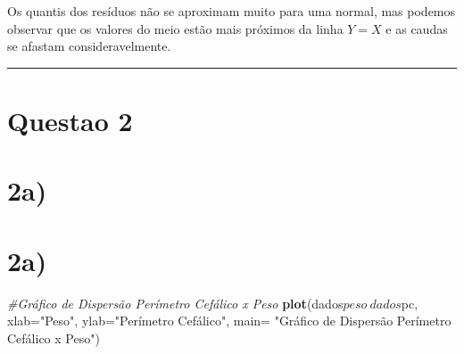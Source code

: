 \documentclass[11pt,]{article}
\newenvironment{Shaded}{\begin{snugshade}}{\end{snugshade}}
\newcommand{\KeywordTok}[1]{\textcolor[rgb]{0.13,0.29,0.53}{\textbf{{#1}}}}
\newcommand{\DataTypeTok}[1]{\textcolor[rgb]{0.13,0.29,0.53}{{#1}}}
\newcommand{\StringTok}[1]{\textcolor[rgb]{0.31,0.60,0.02}{{#1}}}
\newcommand{\CommentTok}[1]{\textcolor[rgb]{0.56,0.35,0.01}{\textit{{#1}}}}
\newcommand{\NormalTok}[1]{{#1}}
\begin{document}
Os quantis dos resíduos não se aproximam muito para uma normal, mas
podemos observar que os valores do meio estão mais próximos da linha
\(Y=X\) e as caudas se afastam consideravelmente.

\begin{center}\rule{0.5\linewidth}{\linethickness}\end{center}

\section{Questao 2}\label{questao-2}

\section{2a)}\label{a-1}

\begin{Shaded}
\end{Shaded}

\section{2a)}\label{a-2}

\begin{Shaded}
\begin{Highlighting}[]
\CommentTok{#Gráfico de Dispersão Perímetro Cefálico x Peso}
\KeywordTok{plot}\NormalTok{(dados$peso~dados$pc, }\DataTypeTok{xlab=}\StringTok{"Peso"}\NormalTok{, }\DataTypeTok{ylab=}\StringTok{"Perímetro Cefálico"}\NormalTok{,}
     \DataTypeTok{main=} \StringTok{"Gráfico de Dispersão Perímetro Cefálico x Peso"}\NormalTok{)}
\end{Highlighting}
\end{Shaded}
\end{document}
